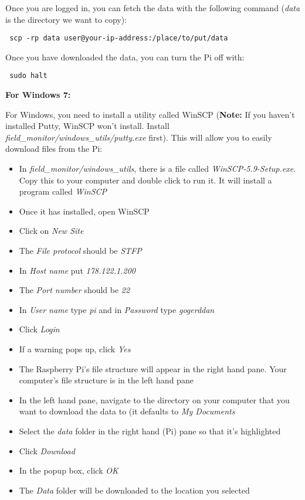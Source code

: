\documentclass[10pt]{article}
\begin{document}
Once you are logged in, you can fetch the data with the following command (\textit{data} is the directory we want to copy):

\begin{verbatim}
 scp -rp data user@your-ip-address:/place/to/put/data
\end{verbatim}

Once you have downloaded the data, you can turn the Pi off with:
\begin{verbatim}
 sudo halt
\end{verbatim}

\textbf{For Windows 7:} \newline

For Windows, you need to install a utility called WinSCP (\textbf{Note:} If you haven't installed Putty, WinSCP won't install. Install \textit{field\_monitor/windows\_utils/putty.exe} first). This will allow you to easily download files from the Pi:

\begin{itemize}
 \item In \textit{field\_monitor/windows\_utils}, there is a file called \textit{WinSCP-5.9-Setup.exe}. Copy this to your computer and double click to run it. It will install a program called \textit{WinSCP}
 \item Once it has installed, open WinSCP
 \item Click on \textit{New Site}
 \item The \textit{File protocol} should be \textit{STFP}
 \item In \textit{Host name} put \textit{178.122.1.200}
 \item The \textit{Port number} should be \textit{22}
 \item In \textit{User name} type \textit{pi} and in \textit{Password} type \textit{gogerddan}
 \item Click \textit{Login}
 \item If a warning pops up, click \textit{Yes}
 \item The Raspberry Pi's file structure will appear in the right hand pane. Your computer's file structure is in the left hand pane
 \item In the left hand pane, navigate to the directory on your computer that you want to download the data to (it defaults to \textit{My Documents}
 \item Select the \textit{data} folder in the right hand (Pi) pane so that it's highlighted
 \item Click \textit{Download} 
 \item In the popup box, click \textit{OK}
 \item The \textit{Data} folder will be downloaded to the location you selected
\end{itemize}
\end{document}
